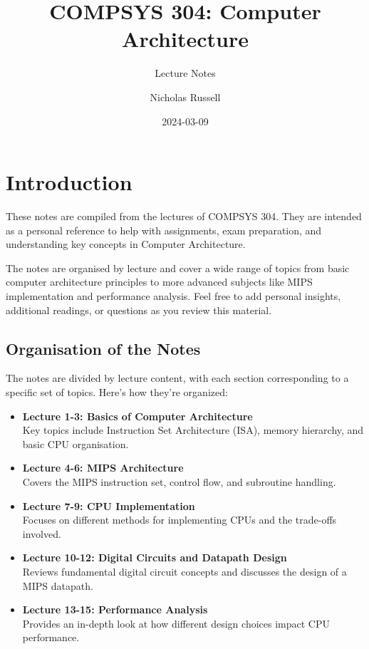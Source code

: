 \documentclass[
  16pt,
  a4paper,
]{report}
\title{COMPSYS 304: Computer Architecture}
\subtitle{Lecture Notes}
\author{Nicholas Russell}
\date{2024-03-09}
\renewcommand*\contentsname{Table of contents}
\newcommand\contentsname{Table of contents}
\begin{document}
\maketitle

\renewcommand*\contentsname{Table of contents}
{
\hypersetup{linkcolor=}
\setcounter{tocdepth}{2}
\tableofcontents
}


\chapter*{Introduction}\label{introduction}


These notes are compiled from the lectures of COMPSYS 304. They are
intended as a personal reference to help with assignments, exam
preparation, and understanding key concepts in Computer Architecture.

The notes are organised by lecture and cover a wide range of topics from
basic computer architecture principles to more advanced subjects like
MIPS implementation and performance analysis. Feel free to add personal
insights, additional readings, or questions as you review this material.

\section*{Organisation of the Notes}\label{organisation-of-the-notes}


The notes are divided by lecture content, with each section
corresponding to a specific set of topics. Here's how they're organized:

\begin{itemize}
\item
  \textbf{Lecture 1-3: Basics of Computer Architecture}\\
  Key topics include Instruction Set Architecture (ISA), memory
  hierarchy, and basic CPU organisation.
\item
  \textbf{Lecture 4-6: MIPS Architecture}\\
  Covers the MIPS instruction set, control flow, and subroutine
  handling.
\item
  \textbf{Lecture 7-9: CPU Implementation}\\
  Focuses on different methods for implementing CPUs and the trade-offs
  involved.
\item
  \textbf{Lecture 10-12: Digital Circuits and Datapath Design}\\
  Reviews fundamental digital circuit concepts and discusses the design
  of a MIPS datapath.
\item
  \textbf{Lecture 13-15: Performance Analysis}\\
  Provides an in-depth look at how different design choices impact CPU
  performance.
\end{itemize}
\end{document}
